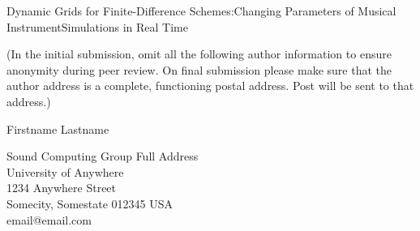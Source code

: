 \documentclass[letterpaper, 12pt, dvipsnames]{article}
\begin{document}
{\cmjTitle Dynamic Grids for Finite-Difference Schemes:Changing Parameters of Musical InstrumentSimulations in Real Time}
\vspace*{24pt}

(In the initial submission, omit all the following author information to ensure anonymity during peer review.
On final submission please make sure that the author address is a complete, functioning postal address.
Post will be sent to that address.)

{\cmjAuthor Firstname Lastname}	%
 
\begin{cmjAuthorAddress}
	Sound Computing Group Full Address\\
	University of Anywhere\\
	1234 Anywhere Street\\
	Somecity, Somestate 012345 USA\\		%
	email@email.com
\end{cmjAuthorAddress}


\begin{abstract}
	
\end{abstract}


\parskip 18pt

\parskip 18pt

\parskip 18pt

\parskip 18pt

\parskip 18pt

\parskip 18pt

\parskip 18pt





\end{document}
